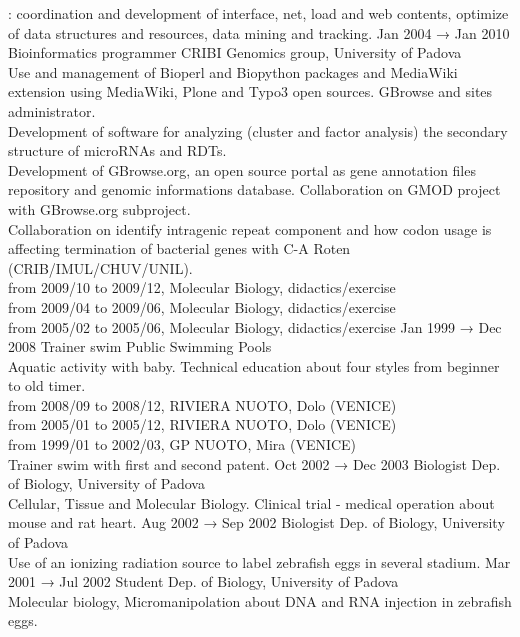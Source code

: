 \documentclass[9pt]{stackoverflow-upgraded-version} %
\begin{document}
\begin{entrylist}
{		: coordination and development of interface, net, load and web contents, optimize of data structures and resources, data mining and tracking.}
	\entry
		{Jan 2004 → Jan 2010}
		{Bioinformatics programmer}
		{CRIBI Genomics group, University of Padova}
		{\\
		Use and management of Bioperl and Biopython packages and MediaWiki extension using MediaWiki, Plone and Typo3 open sources. GBrowse and sites administrator.\\
		Development of software for analyzing (cluster and factor analysis) the secondary structure of microRNAs and RDTs.\\
		Development of GBrowse.org, an open source portal as gene annotation files repository and genomic informations database.
		Collaboration on GMOD project with GBrowse.org subproject.\\
		Collaboration on identify intragenic repeat component and how codon usage is affecting termination of bacterial genes with C-A Roten (CRIB/IMUL/CHUV/UNIL).\\
		from 2009/10 to 2009/12, Molecular Biology, didactics/exercise\\
		from 2009/04 to 2009/06, Molecular Biology, didactics/exercise\\
		from 2005/02 to 2005/06, Molecular Biology, didactics/exercise}
	\entry
		{Jan 1999 → Dec 2008}
		{Trainer swim}
		{Public Swimming Pools}
		{\\
		Aquatic activity with baby. Technical education about four styles from beginner to old timer.\\
		from 2008/09 to 2008/12, RIVIERA NUOTO, Dolo (VENICE)\\
		from 2005/01 to 2005/12, RIVIERA NUOTO, Dolo (VENICE)\\
		from 1999/01 to 2002/03, GP NUOTO, Mira (VENICE)\\
		Trainer swim with first and second patent.}
	\entry
		{Oct 2002 → Dec 2003}
		{Biologist}
		{Dep. of Biology, University of Padova}
		{\\
		Cellular, Tissue and Molecular Biology. Clinical trial - medical operation about mouse and rat heart.}
	\entry
		{Aug 2002 → Sep 2002}
		{Biologist}
		{Dep. of Biology, University of Padova}
		{\\
		Use of an ionizing radiation source to label zebrafish eggs in several stadium.}
	\entry
		{Mar 2001 → Jul 2002}
		{Student}
		{Dep. of Biology, University of Padova}
		{\\
		Molecular biology, Micromanipolation about DNA and RNA injection in zebrafish eggs.}
\end{entrylist}
\end{document}
